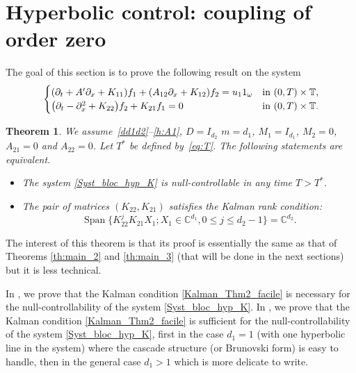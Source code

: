 \documentclass[JEP,XML,SOM,Unicode,NoEqCountersInSection]{cedram}
\theoremstyle{plain}
\newtheorem{theorem}{Theorem}
\theoremstyle{definition}
\theoremstyle{remark}
\DeclareMathOperator{\Span}{Span}
\newcommand{\set}{\mathbb}
\renewcommand{\C}{\set{C}}
\newcommand{\T}{\set{T}}
\let\originalleft\left
\let\originalright\right
\renewcommand{\left}{\mathopen{}\mathclose\bgroup\originalleft}
\renewcommand{\right}{\aftergroup\egroup\originalright}
\begin{document}
\section{Hyperbolic control: coupling of order zero}
\label{sec:cont_parab_simple}

The goal of this section is to prove the following result on the system
\begin{equation} \label{Syst_bloc_hyp_K}
\begin{cases}
\left(\partial_t +A'\partial_x+K_{11}\right)f_1+\left(A_{12}\partial_x+K_{12}\right)f_2= u_1 1_\omega
&\text{in}\ (0,T)\times \T,\!\\
\left(\partial_t -\partial_x^2+K_{22}\right)f_2 + K_{21} f_1 = 0 &\text{in}\ (0,T)\times \T.\!\\
\end{cases}
\end{equation}

\begin{theorem} \label{th:main_2_facile}
We assume~\eqref{dd1d2}--\eqref{h:A1}, $D\!=\!I_{d_2}$ $m\!=\!d_1$, $M_1\!=\!I_{d_1}$, $M_2\!=\!0$, $A_{21}\!=\!0$ and $A_{22}=0$. Let $T^\ast$ be defined by~\eqref{eq:T}.
The following statements are equivalent.
\begin{itemize}
\item The system \eqref{Syst_bloc_hyp_K} is null-controllable in any time $T>T^{\ast}$.
\item The pair of matrices $(K_{22},K_{21})$ satisfies the Kalman rank condition:
\begin{equation} \label{Kalman_Thm2_facile}
\Span \{ K_{22}^j K_{21} X_1 ; X_1 \in \C^{d_1}, 0 \leq j \leq d_2-1 \} = \C^{d_2}.
\end{equation}
\end{itemize}
\end{theorem}

The interest of this theorem is that its proof is essentially the same as that of Theorems \ref{th:main_2} and \ref{th:main_3} (that will be done in the next sections) but it is less technical.

In , we prove that the Kalman condition \eqref{Kalman_Thm2_facile} is necessary for the null-controllability of the system \eqref{Syst_bloc_hyp_K}. In , we prove that the Kalman condition \eqref{Kalman_Thm2_facile} is sufficient for the null-controllability of the system \eqref{Syst_bloc_hyp_K}, first in the case $d_1=1$ (\ie with one hyperbolic line in the system) where the cascade structure (or Brunovski form) is easy to handle, then in the general case $d_1>1$ which is more delicate to write.
\end{document}
